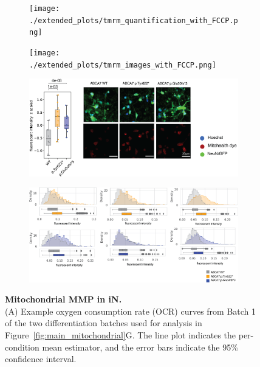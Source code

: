 \begin{figure}[ht]
    \begin{subfigure}[t]{0.3\textwidth}
        \caption{}
        \texttt{[image: ./extended\_plots/tmrm\_quantification\_with\_FCCP.png]}        
    \end{subfigure}
    \begin{subfigure}[t]{0.7\textwidth}
        \caption{}
        \texttt{[image: ./extended\_plots/tmrm\_images\_with\_FCCP.png]}        
    \end{subfigure}
    \begin{subfigure}[t]{0.7\textwidth}
        \caption{}
        \includegraphics[width=\textwidth]{./extended_plots/mitohealth_dye.png}        
    \end{subfigure}
    \par
    \begin{subfigure}[t]{\textwidth}
        \caption{}
        \includegraphics[width=\textwidth]{./extended_plots/mitohealth_per_cell.png}        
    \end{subfigure}
    \caption{
         \textbf{Mitochondrial MMP in iN.}\\[1ex]
         (A) Example oxygen consumption rate (OCR) curves from Batch 1 of the two differentiation batches used for analysis in Figure~\ref{fig:main_mitochondrial}G. The line plot indicates the per-condition mean estimator, and the error bars indicate the 95\% confidence interval. 
}
\end{figure}
